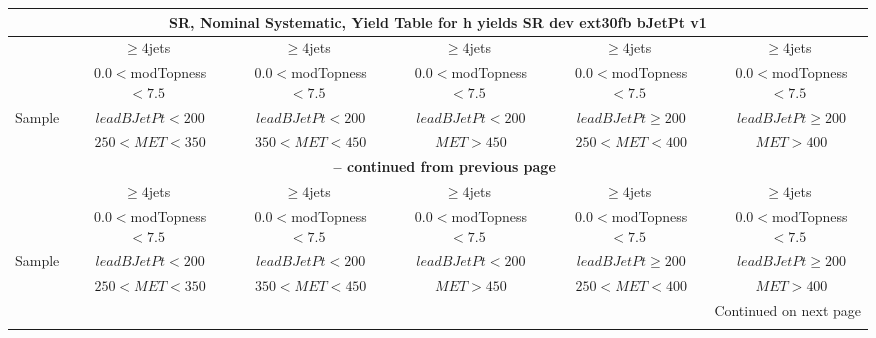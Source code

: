 \documentclass{article}
\begin{document}
\begin{longtable}{|l|c|c|c|c|c|} 
 
\multicolumn{6}{c}{ SR, Nominal Systematic, Yield Table for h yields SR dev ext30fb bJetPt v1 }\\* \hline 
  & $\ge4$jets  & $\ge4$jets  & $\ge4$jets  & $\ge4$jets  & $\ge4$jets \\* 
  & ~$0.0<$modTopness$<7.5$  & ~$0.0<$modTopness$<7.5$  & ~$0.0<$modTopness$<7.5$  & ~$0.0<$modTopness$<7.5$  & ~$0.0<$modTopness$<7.5$ \\* 
Sample  & ~$leadBJetPt<200$  & ~$leadBJetPt<200$  & ~$leadBJetPt<200$  & ~$leadBJetPt\ge200$  & ~$leadBJetPt\ge200$ \\* 
  & ~$250<MET<350$  & ~$350<MET<450$  & ~$MET>450$  & ~$250<MET<400$  & ~$MET>400$ \\* 
\hline \hline 
\endfirsthead 
 
\multicolumn{6}{c}{{\bfseries \tablename\ \thetable{} -- continued from previous page}}\\* \hline 
  & $\ge4$jets  & $\ge4$jets  & $\ge4$jets  & $\ge4$jets  & $\ge4$jets \\* 
  & ~$0.0<$modTopness$<7.5$  & ~$0.0<$modTopness$<7.5$  & ~$0.0<$modTopness$<7.5$  & ~$0.0<$modTopness$<7.5$  & ~$0.0<$modTopness$<7.5$ \\* 
Sample  & ~$leadBJetPt<200$  & ~$leadBJetPt<200$  & ~$leadBJetPt<200$  & ~$leadBJetPt\ge200$  & ~$leadBJetPt\ge200$ \\* 
  & ~$250<MET<350$  & ~$350<MET<450$  & ~$MET>450$  & ~$250<MET<400$  & ~$MET>400$ \\* 
\hline \hline 
\endhead 
 
\multicolumn{6}{|r|}{{Continued on next page}}\\* \hline 
\endfoot 
 
 
\endlastfoot 
 

\end{longtable}
\end{document}
